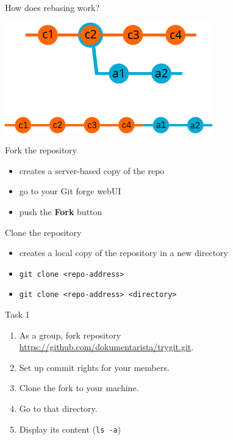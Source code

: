 \documentclass[14pt]{beamer}
\begin{document}
	\begin{frame}{How does rebasing work?}
	\begin{center}
		\includegraphics[width=9cm]{rebase.png}
	\end{center}
	\end{frame}

	\begin{frame}{Fork the repository}
	\begin{itemize}
		\item creates a server-based copy of the repo
		\item go to your Git forge webUI
		\item push the \textbf{Fork} button
	\end{itemize}
	\end{frame}


	\begin{frame}{Clone the repository}
	\begin{itemize}
		\item creates a local copy of the repository in a new directory
		\item \texttt{git clone <repo-address>}
		\item \texttt{git clone <repo-address> <directory>}
	\end{itemize}

	\end{frame}

	\begin{frame}{Task 1}
	\begin{enumerate}
		\item As a group, fork repository \\ {\small \url{https://github.com/dokumentarista/trygit.git}}.
		\item Set up commit rights for your members.
		\item Clone the fork to your machine.
		\item Go to that directory.
		\item Display its content (\texttt{ls -a})
	\end{enumerate}
	
	\end{frame}
\end{document}
